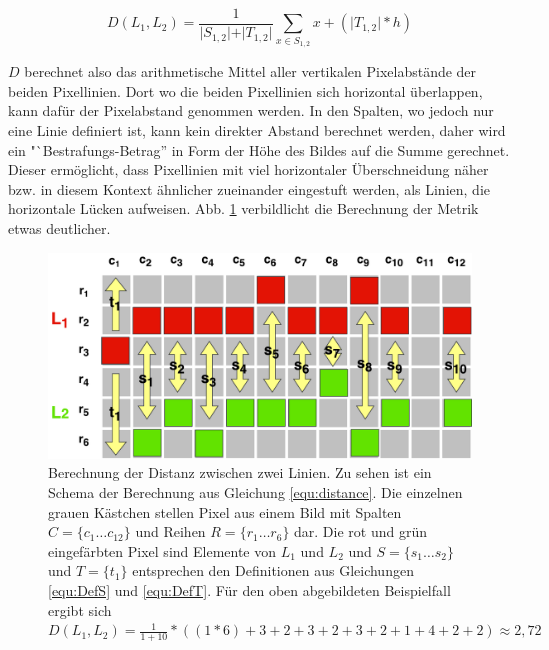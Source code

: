 \begin{equation}
\label{equ:distance}
D(L_{1}, L_{2}) = \frac{1}{\vert S_{1,2} \vert + \vert T_{1,2} \vert} \sum_{x \in S_{1, 2}}^{}x + ( \vert T_{1,2} \vert * h )
\end{equation}

\(D\) berechnet also das arithmetische Mittel aller vertikalen Pixelabstände der beiden Pixellinien. Dort wo die beiden Pixellinien sich horizontal überlappen, kann dafür der Pixelabstand genommen werden. In den Spalten, wo jedoch nur eine Linie definiert ist, kann kein direkter Abstand berechnet werden, daher wird ein "`Bestrafungs-Betrag'' in Form der Höhe des Bildes auf die Summe gerechnet. Dieser ermöglicht, dass Pixellinien mit viel horizontaler Überschneidung näher bzw. in diesem Kontext ähnlicher zueinander eingestuft werden, als Linien, die horizontale Lücken aufweisen. Abb. \ref{fig:LineDistanceSchematic} verbildlicht die Berechnung der Metrik etwas deutlicher. 

\begin{figure}
\centering \includegraphics[width=\textwidth]{images/LineDistance.pdf}
\caption[Berechnung der Distanz zwischen zwei Linien]{Berechnung der Distanz zwischen zwei Linien. Zu sehen ist ein Schema der Berechnung aus Gleichung \ref{equ:distance}. Die einzelnen grauen Kästchen stellen Pixel aus einem Bild mit Spalten \(C = \lbrace c_{1} \ldots c_{12} \rbrace\) und Reihen \(R = \lbrace r_{1} \ldots r_{6} \rbrace\) dar. Die rot und grün eingefärbten Pixel sind Elemente von \(L_{1}\) und \(L_{2}\) und \(S = \lbrace s_{1} \ldots s_{2} \rbrace\) und \(T = \lbrace t_{1} \rbrace\) entsprechen den Definitionen aus Gleichungen \ref{equ:DefS} und \ref{equ:DefT}. Für den oben abgebildeten Beispielfall ergibt sich \(D(L_1, L_2) = \frac{1}{1 + 10} * \left(\left(1 * 6\right) + 3 + 2 + 3 + 2 + 3 + 2 + 1 + 4 + 2 + 2\right) \approx 2,72 \)}\label{fig:LineDistanceSchematic}
\end{figure}

